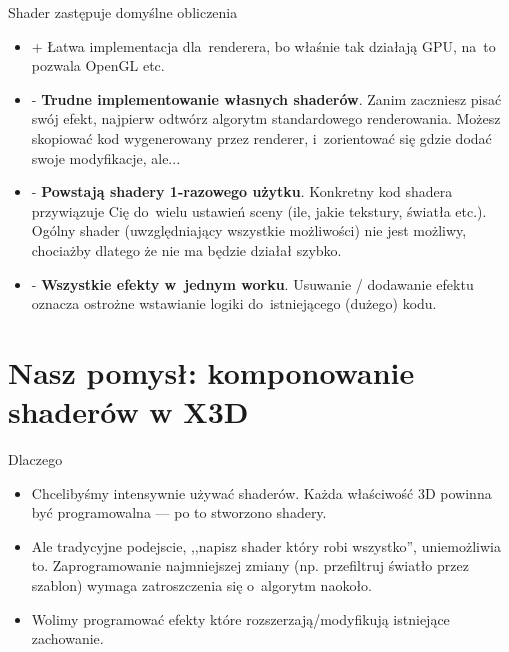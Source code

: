 \documentclass{beamer}
\begin{document}
\begin{frame}{Shader zastępuje domyślne obliczenia}

\begin{itemize}
  \item + Łatwa implementacja dla~renderera, bo właśnie tak działają GPU,
    na~to pozwala OpenGL etc.
  \item - \textbf{Trudne implementowanie własnych shaderów}.
    Zanim zaczniesz pisać swój efekt, najpierw odtwórz algorytm
    standardowego renderowania.
    Możesz skopiować kod wygenerowany przez renderer,
    i~zorientować się gdzie dodać swoje modyfikacje, ale...
  \item - \textbf{Powstają shadery 1-razowego użytku}.
    Konkretny kod shadera przywiązuje Cię do~wielu ustawień sceny
    (ile, jakie tekstury, światła etc.).
    Ogólny shader (uwzględniający wszystkie możliwości) nie jest możliwy,
    chociażby dlatego że nie ma będzie działał szybko.
  \item - \textbf{Wszystkie efekty w~jednym worku}.
    Usuwanie / dodawanie efektu oznacza ostrożne wstawianie logiki
    do~istniejącego (dużego) kodu.
\end{itemize}
\end{frame}

\section[Nasz pomysł]{Nasz pomysł: komponowanie shaderów w X3D}

\begin{frame}{Dlaczego}
\begin{itemize}
  \item Chcelibyśmy intensywnie używać shaderów. Każda właściwość 3D powinna
    być programowalna --- po to stworzono shadery.

  \item Ale tradycyjne podejscie, ,,napisz shader który robi wszystko'',
    uniemożliwia to. Zaprogramowanie najmniejszej zmiany (np. przefiltruj
    światło przez szablon) wymaga zatroszczenia się o~algorytm naokoło.

  \item Wolimy programować efekty które rozszerzają/modyfikują
    istniejące zachowanie.
\end{itemize}
\end{frame}
\end{document}
